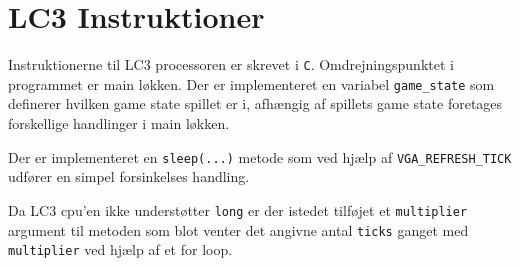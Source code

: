 \section{LC3 Instruktioner}
Instruktionerne til LC3 processoren er skrevet i \texttt{C}. Omdrejningspunktet i programmet er main løkken. Der er implementeret en variabel \texttt{game\_state} som definerer hvilken game state spillet er i, afhængig af spillets game state foretages forskellige handlinger i main løkken.

Der er implementeret en \texttt{sleep(...)} metode som ved hjælp af \texttt{VGA\_REFRESH\_TICK} udfører en simpel forsinkelses handling.


Da LC3 cpu'en ikke understøtter \texttt{long} er der istedet tilføjet et \texttt{multiplier} argument til metoden som blot venter det angivne antal \texttt{ticks} ganget med \texttt{multiplier} ved hjælp af et for loop.